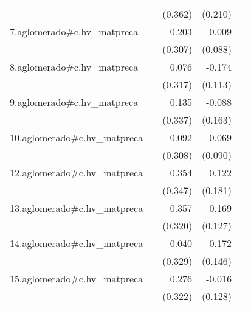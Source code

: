 {\begin{longtable}{l*{4}{D{.}{.}{-1}}}
            &                     &     (0.362)         &     (0.210)         &                     \\
\addlinespace
7.aglomerado#c.hv\_matpreca&                     &       0.203         &       0.009         &                     \\
            &                     &     (0.307)         &     (0.088)         &                     \\
\addlinespace
8.aglomerado#c.hv\_matpreca&                     &       0.076         &      -0.174         &                     \\
            &                     &     (0.317)         &     (0.113)         &                     \\
\addlinespace
9.aglomerado#c.hv\_matpreca&                     &       0.135         &      -0.088         &                     \\
            &                     &     (0.337)         &     (0.163)         &                     \\
\addlinespace
10.aglomerado#c.hv\_matpreca&                     &       0.092         &      -0.069         &                     \\
            &                     &     (0.308)         &     (0.090)         &                     \\
\addlinespace
12.aglomerado#c.hv\_matpreca&                     &       0.354         &       0.122         &                     \\
            &                     &     (0.347)         &     (0.181)         &                     \\
\addlinespace
13.aglomerado#c.hv\_matpreca&                     &       0.357         &       0.169         &                     \\
            &                     &     (0.320)         &     (0.127)         &                     \\
\addlinespace
14.aglomerado#c.hv\_matpreca&                     &       0.040         &      -0.172         &                     \\
            &                     &     (0.329)         &     (0.146)         &                     \\
\addlinespace
15.aglomerado#c.hv\_matpreca&                     &       0.276         &      -0.016         &                     \\
            &                     &     (0.322)         &     (0.128)         &                     \\

\end{longtable}}
